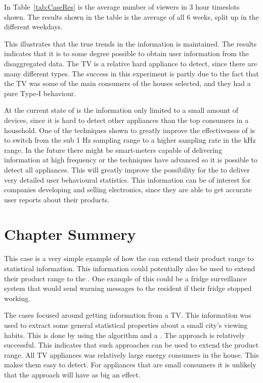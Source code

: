 In Table~\ref{tab:CaseRes} is the average number of viewers in 3 hour timeslots shown. The results shown in the table is the average of all 6 weeks, split up in the different weekdays. 



This illustrates that the true trends in the information is maintained. The results indicates that it is to some degree possible to obtain user information from the disaggregated data. The TV is a relative hard appliance to detect, since there are many different types. The success in this experiment is partly due to the fact that the TV was some of the main consumers of the houses selected, and they had a pure Type-I behaviour.

At the current state of  is the information only limited to a small amount of devices, since it is hard to detect other appliances than the top consumers in a household. One of the techniques shown to greatly improve the effectiveness of  is to switch from the sub 1 Hz sampling range to a higher sampling rate in the kHz range. In the future there might be smart-meters capable of delivering information at high frequency or the  techniques have advanced so it is possible to detect all appliances. This will greatly improve the possibility for the  to deliver very detailed user behavioural statistics. This information can be of interest for companies developing and selling electronics, since they are able to get accurate user reports about their products. 

\section{Chapter Summery}
This case is a very simple example of how the  can extend their product range to statistical information. This information could potentially also be used to extend their product range to the . One example of this could be a fridge surveillance system that would send warning messages to the resident if their fridge stopped working.

The cases focused around getting information from a TV. This information was used to extract some general statistical properties about a small city's viewing habits. This is done by using the  algorithm and a . The approach is relatively successful. This indicates that such approaches can be used to extend the  product range. All TV appliances was relatively large energy consumers in the house. This makes them easy to detect. For appliances that are small consumers it is unlikely that the approach will have as big an effect.